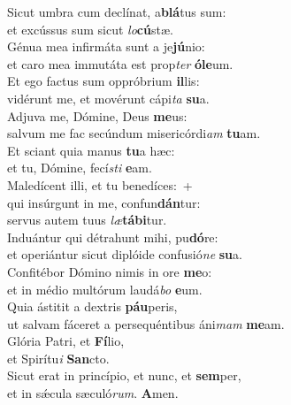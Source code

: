 \evenverse Sicut umbra cum declínat, a\textbf{blá}tus sum:~\*\\
\evenverse et excússus sum sicut \textit{lo}\textbf{cú}stæ.\\
\oddverse Génua mea infirmáta sunt a je\textbf{jú}nio:~\*\\
\oddverse et caro mea immutáta est prop\textit{ter} \textbf{ó}\textbf{le}um.\\
\evenverse Et ego factus sum oppróbrium \textbf{il}lis:~\*\\
\evenverse vidérunt me, et movérunt cápi\textit{ta} \textbf{su}a.\\
\oddverse Adjuva me, Dómine, Deus \textbf{me}us:~\*\\
\oddverse salvum me fac secúndum misericórdi\textit{am} \textbf{tu}am.\\
\evenverse Et sciant quia manus \textbf{tu}a hæc:~\*\\
\evenverse et tu, Dómine, fecí\textit{sti} \textbf{e}am.\\
\oddverse Maledícent illi, et tu benedíces:~+\\
\oddverse  qui insúrgunt in me, confun\textbf{dán}tur:~\*\\
\oddverse servus autem tuus \textit{læ}\textbf{tá}\textbf{bi}tur.\\
\evenverse Induántur qui détrahunt mihi, pu\textbf{dó}re:~\*\\
\evenverse et operiántur sicut diplóide confusió\textit{ne} \textbf{su}a.\\
\oddverse Confitébor Dómino nimis in ore \textbf{me}o:~\*\\
\oddverse et in médio multórum laudá\textit{bo} \textbf{e}um.\\
\evenverse Quia ástitit a dextris \textbf{páu}peris,~\*\\
\evenverse ut salvam fáceret a persequéntibus áni\textit{mam} \textbf{me}am.\\
\oddverse Glória Patri, et \textbf{Fí}lio,~\*\\
\oddverse et Spirítu\textit{i} \textbf{San}cto.\\
\evenverse Sicut erat in princípio, et nunc, et \textbf{sem}per,~\*\\
\evenverse et in sǽcula sæculó\textit{rum}. \textbf{A}men.\\
